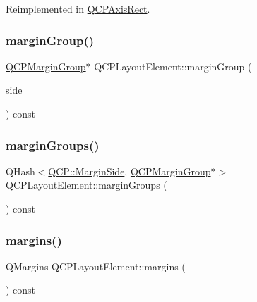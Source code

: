 Reimplemented in \mbox{\hyperlink{class_q_c_p_axis_rect_a575e38ac71a21906dc2d7b3364db2d62}{Q\+C\+P\+Axis\+Rect}}.

\mbox{\label{class_q_c_p_layout_element_a8af6bcf81e12fe1d6f44490f34522b90}} 
\subsubsection{\texorpdfstring{marginGroup()}{marginGroup()}}
{\footnotesize\ttfamily \mbox{\hyperlink{class_q_c_p_margin_group}{Q\+C\+P\+Margin\+Group}}$\ast$ Q\+C\+P\+Layout\+Element\+::margin\+Group (\begin{DoxyParamCaption}\item[{\mbox{\hyperlink{namespace_q_c_p_a7e487e3e2ccb62ab7771065bab7cae54}{Q\+C\+P\+::\+Margin\+Side}}}]{side }\end{DoxyParamCaption}) const\hspace{0.3cm}{\ttfamily [inline]}}

\mbox{\label{class_q_c_p_layout_element_ac8d1139a81a1625860647e307ae2b733}} 
\subsubsection{\texorpdfstring{marginGroups()}{marginGroups()}}
{\footnotesize\ttfamily Q\+Hash$<$\mbox{\hyperlink{namespace_q_c_p_a7e487e3e2ccb62ab7771065bab7cae54}{Q\+C\+P\+::\+Margin\+Side}}, \mbox{\hyperlink{class_q_c_p_margin_group}{Q\+C\+P\+Margin\+Group}}$\ast$$>$ Q\+C\+P\+Layout\+Element\+::margin\+Groups (\begin{DoxyParamCaption}{ }\end{DoxyParamCaption}) const\hspace{0.3cm}{\ttfamily [inline]}}

\mbox{\label{class_q_c_p_layout_element_af4ac9450aa2d60863bf3a8ea0c940c9d}} 
\subsubsection{\texorpdfstring{margins()}{margins()}}
{\footnotesize\ttfamily Q\+Margins Q\+C\+P\+Layout\+Element\+::margins (\begin{DoxyParamCaption}{ }\end{DoxyParamCaption}) const\hspace{0.3cm}{\ttfamily [inline]}}

